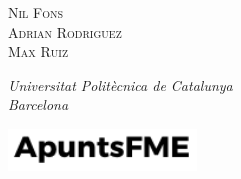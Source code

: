 \begin{titlepage}
    {\scshape\Large Nil Fons \\ Adrian Rodriguez \\  Max Ruiz \\} %

    \vspace{2\baselineskip} %

    \textit{Universitat Politècnica de Catalunya \\ Barcelona} %

    \vfill %


    \includegraphics[width=5cm]{../logo.pdf}

    \vspace{0.3\baselineskip} %
        
    \mydate %


\end{titlepage}
